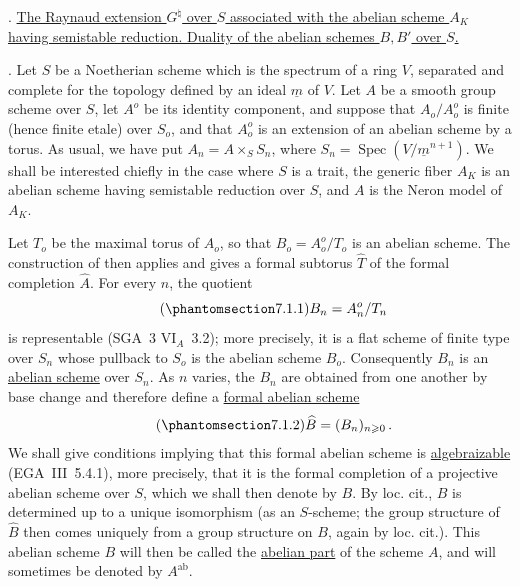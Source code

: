 
\medskip
{}. \underline{The Raynaud extension $G^\natural$ over $S$ associated
with the abelian scheme $A_K$ having semistable reduction.  Duality of
the abelian schemes $B,B'$ over $S$.}

\medskip
\noindent
{}. Let $S$ be a Noetherian scheme which is the spectrum of a ring
$V$, separated and complete for the topology defined by an ideal
$\underline m$ of $V$.  Let $A$ be a smooth group scheme over $S$, let
$A^o$ be its identity component, and suppose that $A_o/A_o^o$ is
finite (hence finite etale) over $S_o$, and that $A_o^o$ is an
extension of an abelian scheme by a torus.  As usual, we have put
$A_n=A\times_S S_n$, where
$S_n=\operatorname{Spec}(V/\underline m^{n+1})$.  We shall be
interested chiefly in the case where $S$ is a trait, the generic fiber
$A_K$ is an abelian scheme having semistable reduction over $S$, and
$A$ is the Neron model of $A_K$.

Let $T_o$ be the maximal torus of $A_o$, so that
$B_o=A_o^o/T_o$ is an abelian scheme.  The construction of  then
applies and gives a formal subtorus $\widehat T$ of the formal
completion $\widehat A$.  For every $n$, the quotient
\begin{equation}\tag{\SGARefTarget{sga7.sga7i.eix.n7-1-1}{7.1.1}}
 B_n=A_n^o/T_n
\end{equation}
is representable (SGA~3 $\mathrm{VI}_A$~3.2); more precisely, it is a
flat scheme of finite type over $S_n$ whose pullback to $S_o$ is the
abelian scheme $B_o$.  Consequently $B_n$ is an \underline{abelian
scheme} over $S_n$.  As $n$ varies, the $B_n$ are obtained from one
another by base change and therefore define a \underline{formal
abelian scheme}
\begin{equation}\tag{\SGARefTarget{sga7.sga7i.eix.n7-1-2}{7.1.2}}
 \widehat B=(B_n)_{n\geqslant0}\,.
\end{equation}
We shall give conditions implying that this formal abelian scheme is
\underline{algebraizable} (EGA~III~5.4.1), more precisely, that it is
the formal completion of a projective abelian scheme over $S$, which
we shall then denote by $B$.  By loc. cit., $B$ is determined up to a
unique isomorphism (as an $S$-scheme; the group structure of
$\widehat B$ then comes uniquely from a group structure on $B$, again
by loc. cit.).  This abelian scheme $B$ will then be called the
\underline{abelian part} of the scheme $A$, and will sometimes be
denoted by $A^{\mathrm{ab}}$.

